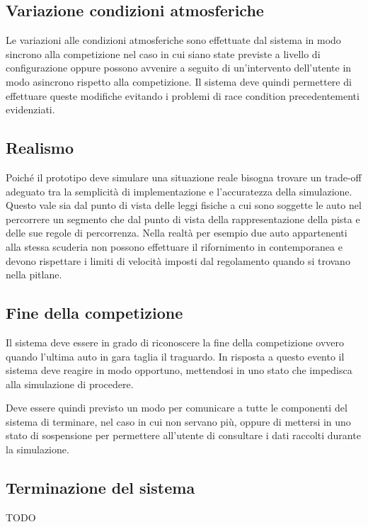 \documentclass[11pt,a4paper]{report}
\begin{document}
\subsection*{Variazione condizioni atmosferiche}
Le variazioni alle condizioni atmosferiche sono effettuate dal sistema in modo sincrono alla competizione nel caso in cui siano state previste a livello di configurazione oppure possono avvenire a seguito di un'intervento dell'utente in modo asincrono rispetto alla competizione. Il sistema deve quindi permettere di effettuare queste modifiche evitando i problemi di race condition precedentementi evidenziati.

\subsection*{Realismo}
Poiché il prototipo deve simulare una situazione reale bisogna trovare un trade-off adeguato tra la semplicità di implementazione e l'accuratezza della simulazione. Questo vale sia dal punto di vista delle leggi fisiche a cui sono soggette le auto nel percorrere un segmento che dal punto di vista della rappresentazione della pista e delle sue regole di percorrenza. Nella realtà per esempio due auto appartenenti alla stessa scuderia non possono effettuare il rifornimento in contemporanea e devono rispettare i limiti di velocità imposti dal regolamento quando si trovano nella pitlane.

\subsection*{Fine della competizione}
Il sistema deve essere in grado di riconoscere la fine della competizione ovvero quando l'ultima auto in gara taglia il traguardo. In risposta a questo evento il sistema deve reagire in modo opportuno, mettendosi in uno stato che impedisca alla simulazione di procedere.

Deve essere quindi previsto un modo per comunicare a tutte le componenti del sistema di terminare, nel caso in cui non servano più, oppure di mettersi in uno stato di sospensione per permettere all'utente di consultare i dati raccolti durante la simulazione.

\subsection*{Terminazione del sistema}
TODO
\end{document}
